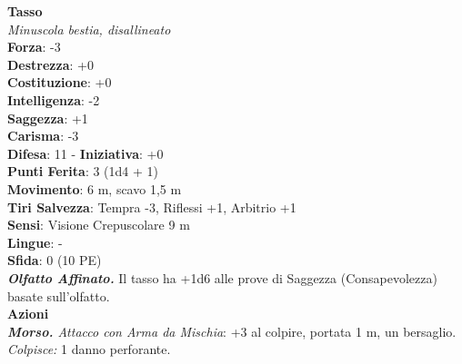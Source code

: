 \begin{multicols}{2}
\medskip\textbf{Tasso}\\
\emph{Minuscola bestia, disallineato}\\
\textbf{Forza}: -3\\
\textbf{Destrezza}: +0\\
\textbf{Costituzione}: +0\\
\textbf{Intelligenza}: -2\\
\textbf{Saggezza}: +1\\
\textbf{Carisma}: -3\\
\textbf{Difesa}: 11 - \textbf{Iniziativa}: +0\\
\textbf{Punti Ferita}: 3 (1d4 + 1)\\
\textbf{Movimento}: 6 m, scavo 1,5 m\\
\textbf{Tiri Salvezza}: Tempra -3, Riflessi +1, Arbitrio +1\\
\textbf{Sensi}: Visione Crepuscolare 9 m\\
\textbf{Lingue}: -\\
\textbf{Sfida}: 0 (10 PE)\smallskip\\
\emph{\textbf{Olfatto Affinato.}} Il tasso ha +1d6 alle prove di Saggezza (Consapevolezza) basate sull'olfatto.\\
\smallskip\textbf{Azioni}\\
\emph{\textbf{Morso.} Attacco con Arma da Mischia}: +3 al colpire, portata 1 m, un bersaglio.\\
\emph{Colpisce:} 1 danno perforante.\\


\end{multicols}
